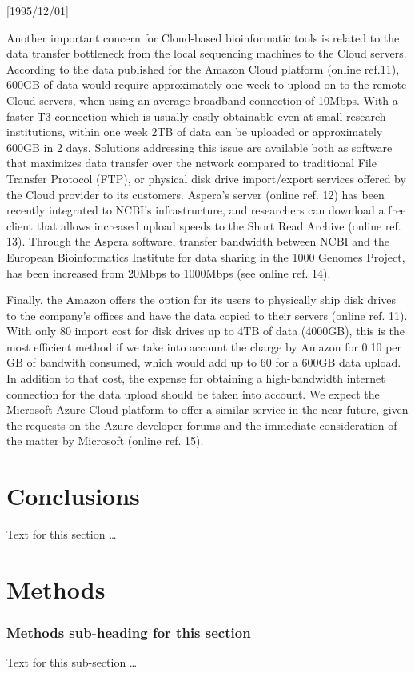 \NeedsTeXFormat{LaTeX2e}[1995/12/01] \documentclass[10pt]{bmc_article}
\newenvironment{bmcformat}{\begin{raggedright}\baselineskip20pt\sloppy\setboolean{publ}{false}}{\end{raggedright}\baselineskip20pt\sloppy}
\begin{document}
\begin{bmcformat}
Another important concern for Cloud-based bioinformatic tools is related to the data transfer bottleneck from
the local sequencing machines to the Cloud servers.  According to the data published for the Amazon Cloud
platform (online ref.11), 600GB of data would require approximately one week to upload on to the remote Cloud
servers, when using an average broadband connection of 10Mbps. With a faster T3 connection which is usually
easily obtainable even at small research institutions, within one week 2TB of data can be uploaded or
approximately 600GB in 2 days.  Solutions addressing this issue are available both as software that maximizes
data transfer over the network compared to traditional File Transfer Protocol (FTP), or physical disk drive
import/export services offered by the Cloud provider to its customers. Aspera's server (online ref. 12) has
been recently integrated to NCBI's infrastructure, and researchers can download a free client that allows
increased upload speeds to the Short Read Archive (online ref. 13).  Through the Aspera software, transfer
bandwidth between NCBI and the European Bioinformatics Institute for data sharing in the 1000 Genomes Project,
has been increased from 20Mbps to 1000Mbps (see online ref. 14). 

Finally, the Amazon offers the option for its users to physically ship disk drives to the company's offices
and have the data copied to their servers (online ref. 11). With only 80 import cost for disk drives up to 4TB
of data (4000GB), this is the most efficient method if we take into account the charge by Amazon for 0.10 per
GB of bandwith consumed, which would add up to 60 for a 600GB data upload. In addition to that cost, the
expense for obtaining a high-bandwidth internet connection for the data upload should be taken into account.
We expect the Microsoft Azure Cloud platform to offer a similar service in the near future, given the requests
on the Azure developer forums and the immediate consideration of the matter by Microsoft (online ref. 15).



\section*{Conclusions} Text for this section \ldots



\section*{Methods} \subsubsection*{Methods sub-heading for this section} Text for this sub-section \ldots


\end{bmcformat}
\end{document}
